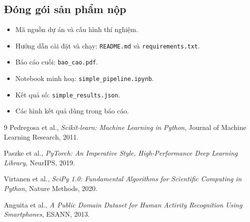 \documentclass[12pt,a4paper]{article}
\begin{document}
\subsection{Đóng gói sản phẩm nộp}

\begin{itemize}
    \item Mã nguồn dự án và cấu hình thí nghiệm.
    \item Hướng dẫn cài đặt và chạy: \texttt{README.md} và \texttt{requirements.txt}.
    \item Báo cáo cuối: \texttt{bao\_cao.pdf}.
    \item Notebook minh hoạ: \texttt{simple\_pipeline.ipynb}.
    \item Kết quả số: \texttt{simple\_results.json}.
    \item Các hình kết quả dùng trong báo cáo.
\end{itemize}


\begin{thebibliography}{9}
Pedregosa et al., \textit{Scikit-learn: Machine Learning in Python}, Journal of Machine Learning Research, 2011.

Paszke et al., \textit{PyTorch: An Imperative Style, High-Performance Deep Learning Library}, NeurIPS, 2019.

Virtanen et al., \textit{SciPy 1.0: Fundamental Algorithms for Scientific Computing in Python}, Nature Methods, 2020.

Anguita et al., \textit{A Public Domain Dataset for Human Activity Recognition Using Smartphones}, ESANN, 2013.
\end{thebibliography}
\end{document}
